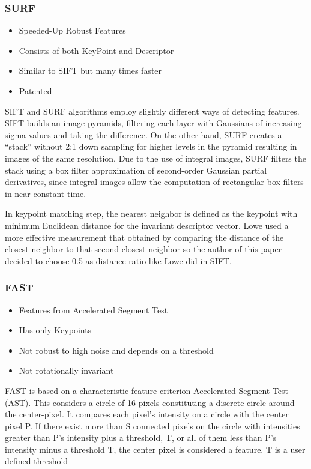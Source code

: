 \documentclass{article}[11pt]
\begin{document}
\subsubsection{SURF}
\begin{itemize}
    \item Speeded-Up Robust Features
    \item Consists of both KeyPoint and Descriptor
    \item  Similar to SIFT but many times faster
    \item Patented
\end{itemize}

SIFT and SURF algorithms employ slightly different ways of detecting features. SIFT builds an image
pyramids, filtering each layer with Gaussians of increasing sigma values and taking the difference. On the
other hand, SURF creates a “stack” without 2:1 down sampling for higher levels in the pyramid resulting
in images of the same resolution. Due to the use of integral images, SURF filters the stack using a box
filter approximation of second-order Gaussian partial derivatives, since integral images allow the
computation of rectangular box filters in near constant time.

In keypoint matching step, the nearest neighbor is defined as the keypoint with minimum Euclidean
distance for the invariant descriptor vector. Lowe used a more effective measurement that obtained by
comparing the distance of the closest neighbor to that second-closest neighbor so the author of this
paper decided to choose 0.5 as distance ratio like Lowe did in SIFT.

\subsubsection{FAST}
\begin{itemize}
    \item Features from Accelerated Segment Test
    \item Has only Keypoints
    \item Not robust to high noise and depends on a threshold
    \item Not rotationally invariant
\end{itemize}

FAST is based on a characteristic feature criterion Accelerated Segment Test (AST). This considers a circle of 16 pixels constituting a discrete circle around the center-pixel. It compares each pixel’s intensity on a circle with the center pixel P. If there exist more than S connected pixels on the circle with intensities greater than P’s intensity plus a threshold, T, or all of them less than P’s intensity minus a threshold T, the center pixel is considered a feature. T is a user deﬁned threshold
\end{document}
